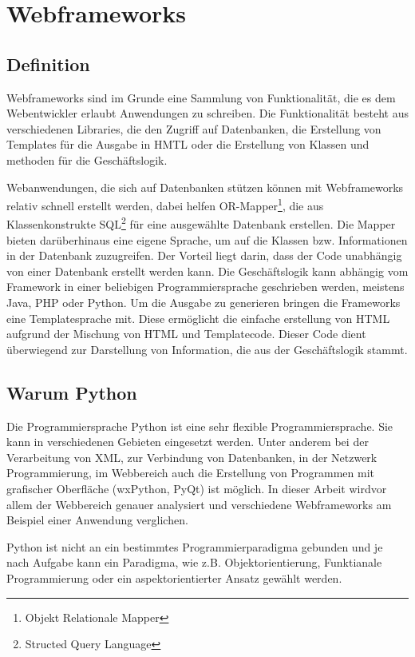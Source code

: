 \chapter{Webframeworks}
\section{Definition}
Webframeworks sind im Grunde eine Sammlung von Funktionalität, die es dem
Webentwickler erlaubt Anwendungen zu schreiben. Die Funktionalität besteht aus
verschiedenen Libraries, die den Zugriff auf Datenbanken, die Erstellung von
Templates für die Ausgabe in HMTL oder die Erstellung von Klassen und methoden
für die Geschäftslogik. 

Webanwendungen, die sich auf Datenbanken stützen können mit Webframeworks
relativ schnell erstellt werden, dabei helfen OR-Mapper\footnote{Objekt
Relationale Mapper}, die aus Klassenkonstrukte SQL\footnote{Structed Query
Language} für eine ausgewählte Datenbank erstellen. Die Mapper bieten
darüberhinaus eine eigene Sprache, um auf die Klassen bzw. Informationen in der
Datenbank zuzugreifen. Der Vorteil liegt darin, dass der Code unabhängig von
einer Datenbank erstellt werden kann. Die Geschäftslogik kann abhängig vom
Framework in einer beliebigen Programmiersprache geschrieben werden, meistens
Java, PHP oder Python. Um die Ausgabe zu generieren bringen die Frameworks eine
Templatesprache mit. Diese ermöglicht die einfache erstellung von HTML aufgrund
der Mischung von HTML und Templatecode. Dieser Code dient überwiegend zur
Darstellung von Information, die aus der Geschäftslogik stammt. 

\section{Warum Python}
Die Programmiersprache Python ist eine sehr flexible Programmiersprache. Sie
kann in verschiedenen Gebieten eingesetzt werden. Unter anderem bei der
Verarbeitung von XML, zur Verbindung von Datenbanken, in der Netzwerk 
Programmierung, im Webbereich auch die Erstellung von Programmen mit grafischer
Oberfläche (wxPython, PyQt) ist möglich. In dieser Arbeit wirdvor  allem der 
Webbereich genauer analysiert und verschiedene Webframeworks am Beispiel einer
Anwendung verglichen.

Python ist nicht an ein bestimmtes Programmierparadigma gebunden und je nach
Aufgabe kann ein Paradigma, wie z.B. Objektorientierung, Funktianale
Programmierung oder ein aspektorientierter Ansatz gewählt werden. 

